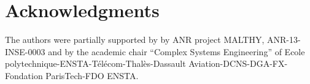 \documentclass{sig-alternate-05-2015}
\begin{document}
\section{Acknowledgments}
The authors were partially supported by by ANR project MALTHY, ANR-13-INSE-0003 and by the academic chair “Complex Systems Engineering” 
of Ecole polytechnique-ENSTA-T\'el\'ecom-Thal\`es-Dassault Aviation-DCNS-DGA-FX-Fondation ParisTech-FDO ENSTA.



\end{document}
